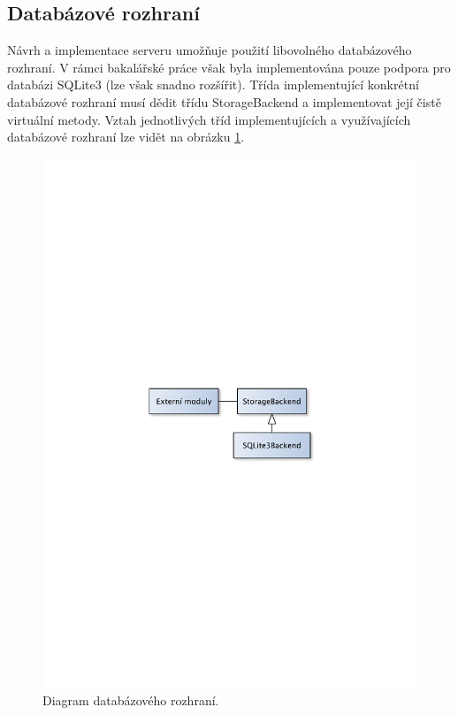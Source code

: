 \subsection{Databázové rozhraní}
\label{implementace_db}

Návrh a implementace serveru umožňuje použití libovolného databázového rozhraní.
V rámci bakalářské práce však byla implementována 
pouze podpora pro databázi SQLite3 (lze však snadno rozšířit). Třída implementující konkrétní databázové rozhraní musí dědit třídu StorageBackend a implementovat
její čistě virtuální metody. Vztah jednotlivých tříd implementujících a využívajících databázové rozhraní lze vidět
na obrázku \ref{fig:imp_databaze}.

\begin{figure}[h]
\centering
\includegraphics[trim=12cm 12cm 12cm 12cm, scale=0.7]{fig/imp_databaze}
\caption{Diagram databázového rozhraní.}
\label{fig:imp_databaze}
\end{figure}

